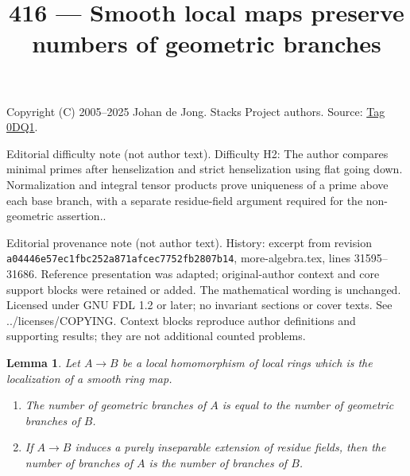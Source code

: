 \documentclass{amsart}
\theoremstyle{plain}
\newtheorem{lemma}[subsection]{Lemma}
\theoremstyle{definition}
\theoremstyle{remark}
\numberwithin{equation}{subsection}
\begin{document}
\title[Stacks Project, Tag 0DQ1]{416 --- Smooth local maps preserve numbers of geometric branches}
\maketitle
\noindent Copyright (C) 2005--2025 Johan de Jong. Stacks Project authors. Source: \href{https://stacks.math.columbia.edu/tag/0DQ1}{Tag 0DQ1}.

\noindent Editorial difficulty note (not author text). Difficulty H2: The author compares minimal primes after henselization and strict henselization using flat going down. Normalization and integral tensor products prove uniqueness of a prime above each base branch, with a separate residue-field argument required for the non-geometric assertion..

\noindent Editorial provenance note (not author text). History: excerpt from revision \texttt{a0444\allowbreak 6e57e\allowbreak c1fbc\allowbreak 252a8\allowbreak 71afc\allowbreak ec775\allowbreak 2fb28\allowbreak 07b14}, more-algebra.tex, lines 31595--31686. Reference presentation was adapted; original-author context and core support blocks were retained or added. The mathematical wording is unchanged. Licensed under GNU FDL 1.2 or later; no invariant sections or cover texts. See ../licenses/COPYING. Context blocks reproduce author definitions and supporting results; they are not additional counted problems.

\begin{lemma}
\label{lemma-invariance-number-branches-smooth}
Let $A \to B$ be a local homomorphism of local rings which
is the localization of a smooth ring map.
\begin{enumerate}
\item The number of geometric branches of $A$ is equal to the number
of geometric branches of $B$.
\item If $A \to B$ induces a purely inseparable extension of residue fields,
then the number of branches of $A$ is the number of branches of $B$.
\end{enumerate}
\end{lemma}
\end{document}
